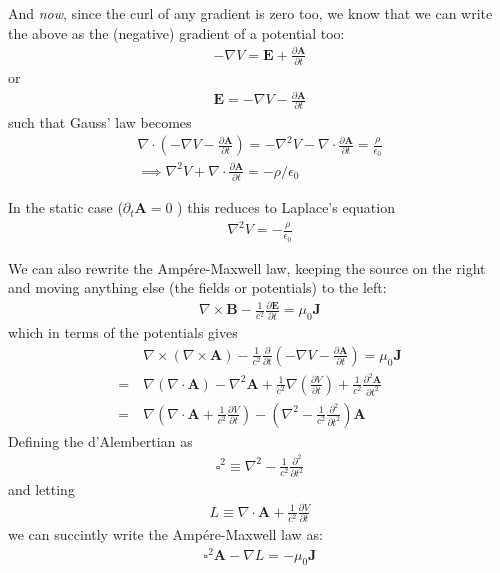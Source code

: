 And \textit{now}, since the curl of any gradient is zero too, we know that we can write the above as the (negative) gradient of a potential too:
\begin{align*}
    - \nabla V = \mathbf{E} +\frac{\partial \mathbf{A}}{\partial t}
\end{align*}
or \begin{align*}
    \boxed{\mathbf{E} = -\nabla V - \frac{\partial \mathbf{A}}{\partial t}}
\end{align*}
such that Gauss' law becomes \begin{align*}
    \nabla \cdot \left( -\nabla V - \frac{\partial \mathbf{A}}{\partial t}  \right) = - \nabla^{2} V - \nabla \cdot \frac{\partial \mathbf{A}}{\partial t} = \frac{\rho}{\epsilon _0}\\
    \implies \nabla ^{2} V + \nabla \cdot \frac{\partial \mathbf{A}}{\partial t} = -\rho  /\epsilon_0
\end{align*}

In the static case (\(\partial _t \mathbf{A} = 0\) ) this reduces to Laplace's equation \begin{align*}
    \nabla ^{2} V = - \frac{\rho}{\epsilon _0}
\end{align*}

We can also rewrite the Ampére-Maxwell law, keeping the source on the right and moving anything else (the fields or potentials) to the left: \begin{align*}
    \nabla \times \mathbf{B} - \frac{1}{c^{2}} \frac{\partial \mathbf{E}}{\partial t} = \mu _0 \mathbf{J}
\end{align*}
which in terms of the potentials gives \begin{align*}
    &\nabla \times \left( \nabla \times \mathbf{A}\right) - \frac{1}{c^{2} } \frac{\partial}{\partial t} \left( -\nabla V - \frac{\partial \mathbf{A}}{\partial t}  \right)  = \mu _0 \mathbf{J}\\
    =\ &\nabla (\nabla \cdot \mathbf{A}) - \nabla ^{2} \mathbf{A} + \frac{1}{c^{2}}\nabla \left( \frac{\partial V}{\partial t}  \right) + \frac{1}{c^{2}}\frac{\partial^{2} \mathbf{A}}{\partial t^{2} } \\
    =\ &\nabla \left( \nabla \cdot \mathbf{A} + \frac{1}{c^{2} } \frac{\partial V}{\partial t} \right) - \left( \nabla ^{2} - \frac{1}{c^{2}} \frac{\partial^{2} }{\partial t^{2} }  \right)\mathbf{A}
\end{align*}
Defining the d'Alembertian as \begin{align*}
    \square^{2} \equiv \nabla ^{2} - \frac{1}{c^{2} }\frac{\partial ^{2}}{\partial t^{2} }  
\end{align*}
and letting \begin{align*}
    L \equiv \nabla \cdot \mathbf{A} + \frac{1}{c^{2} } \frac{\partial V}{\partial t} 
\end{align*}
we can succintly write the Ampére-Maxwell law as: \begin{align*}
    \boxed{\square^{2} \mathbf{A} - \nabla L = - \mu _0 \mathbf{J}}
\end{align*}

